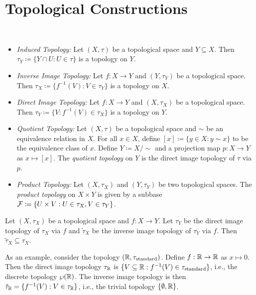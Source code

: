 \documentclass{techreport}
\begin{document}
\section{Topological Constructions}

\begin{definition}\label{De:SomeMoreTopologies}\
	\begin{itemize}
		\item \emph{Induced Topology:} Let $(X,\tau)$ be a topological space and $Y \subseteq X$.
		Then $\tau_Y \coloneqq \{ Y \cap U : U \in \tau \}$ is a topology on $Y$.
		\item \emph{Inverse Image Topology:} Let $f : X \to Y$ and $(Y,\tau_Y)$ be a topological space. Then $\tau_X \coloneqq \{ f^{-1}(V) : V \in \tau_Y \}$ is a topology on $X$.
		\item \emph{Direct Image Topology:} Let $f : X \to Y$ and $(X,\tau_X)$ be a topological space. Then $\tau_Y \coloneqq \{ V : f^{-1}(V) \in \tau_X \}$ is a topology on $Y$.
		\item \emph{Quotient Topology:} Let $(X,\tau)$ be a topological space and ${\sim}$ be an equivalence relation in $X$.
		For all $x \in X$, define $[x] \coloneqq \{ y \in X : y \sim x \}$ to be the equivalence class of $x$.
		Define $Y \coloneqq X /{\sim}$ and a projection map $p : X \to Y$ as $x \mapsto [x]$.
		The \emph{quotient topology} on $Y$ is the direct image topology of $\tau$ via $p$.
		\item \emph{Product Topology:} Let $(X,\tau_X)$ and $(Y,\tau_Y)$ be two topological spaces.
		The \emph{product topology} on $X \times Y$ is given by a subbase $\mathcal{F} \coloneqq \{ U \times V : U \in \tau_X, V \in \tau_Y \}$.
	\end{itemize}
\end{definition}

\begin{remark}\label{Rem:DirectThenInverseIsWeaker}
	Let $(X,\tau_X)$ be a topological space and $f : X \to Y$.
	Let $\tau_Y$ be the direct image topology of $\tau_X$ via $f$ and $\tilde{\tau}_X$ be the inverse image topology of $\tau_Y$ via $f$.
	Then $\tilde{\tau}_X \subseteq \tau_X$.

	As an example, consider the topology $(\mathbb{R},\tau_{\mathrm{standard}})$.
	Define $f : \mathbb{R} \to \mathbb{R}$ as $x \mapsto 0$.
	Then the direct image topology $\tau_{\mathbb{R}}$ is $\{ V \subseteq \mathbb{R} : f^{-1}(V) \in \tau_\mathrm{standard} \}$, i.e., the discrete topology $\wp(\mathbb{R})$.
	The inverse image topology is then $\tilde{\tau}_{\mathbb{R}} = \{ f^{-1}(V) : V \in \tau_{\mathbb{R}} \}$, i.e., the trivial topology $\{ \emptyset, \mathbb{R} \}$.
\end{remark}
\end{document}
